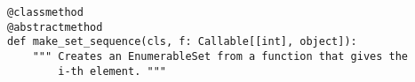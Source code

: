 \par\begin{minipage}{63ex}
\begin{verbatim}
@classmethod
@abstractmethod
def make_set_sequence(cls, f: Callable[[int], object]):
    """ Creates an EnumerableSet from a function that gives the
        i-th element. """
\end{verbatim}
\end{minipage}\par